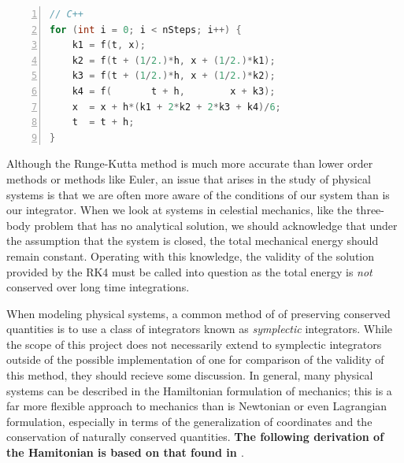 \documentclass[onecolumn,titlepage,letterpaper,10pt]{article}
\begin{document}
\begin{lstlisting}[language=c++, numbers=left, caption=Fourth-order Runge-Kutta (RK4),
label=listing_RK4, float=h!]
// C++
for (int i = 0; i < nSteps; i++) {
    k1 = f(t, x);
    k2 = f(t + (1/2.)*h, x + (1/2.)*k1);
    k3 = f(t + (1/2.)*h, x + (1/2.)*k2);
    k4 = f(       t + h,        x + k3);
    x  = x + h*(k1 + 2*k2 + 2*k3 + k4)/6;
    t  = t + h;
}
\end{lstlisting}

Although the Runge-Kutta method is much more accurate than lower order methods
or methods like Euler, an issue that arises in the study of physical
systems is that we are often more aware of the conditions of our system than is
our integrator. When we look at systems in celestial mechanics, like the
three-body problem that has no analytical solution, we should
acknowledge that under the assumption that the system is closed, the total
mechanical energy should remain constant. Operating with this
knowledge, the validity of the solution provided by the RK4 must be called into
question as the total energy is \textit{not} conserved over long time
integrations. \cite{holmes_2018}

When modeling physical systems, a common method of of preserving conserved
quantities is to use a class of integrators known as \textit{symplectic}
integrators. While the scope of this project does not necessarily extend
to symplectic integrators outside of the possible implementation of one for
comparison of the validity of this method, they should recieve some discussion.
In general, many physical systems can be described in the Hamiltonian
formulation of mechanics; this is a far more flexible approach to mechanics than
is Newtonian or even Lagrangian formulation, especially in terms of the
generalization of coordinates and the conservation of naturally conserved
quantities. \textbf{The following derivation of the Hamitonian is based on that found in
    \citet{taylor_2005}}.
\end{document}
